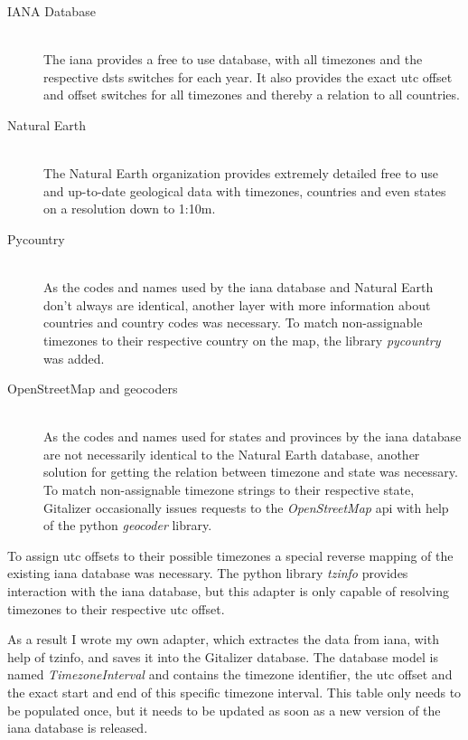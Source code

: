 \begin{description}
    \item[IANA Database] \hfill \\
    The \ac{iana} provides a free to use database, with all timezones and the respective \acp{dst} switches for each year.
    It also provides the exact \ac{utc} offset and offset switches for all timezones and thereby a relation to all countries.

    \item[Natural Earth] \hfill \\
    The Natural Earth organization provides extremely detailed free to use and up-to-date geological data with timezones, countries and even states on a resolution down to 1:10m.

    \item[Pycountry] \hfill \\
    As the codes and names used by the \ac{iana} database and Natural Earth don't always are identical, another layer with more information about countries and country codes was necessary.
    To match non-assignable timezones to their respective country on the map, the library \emph{pycountry} was added.

    \item[OpenStreetMap and geocoders] \hfill \\
    As the codes and names used for states and provinces by the \ac{iana} database are not necessarily identical to the Natural Earth database, another solution for getting the relation between timezone and state was necessary.
    To match non-assignable timezone strings to their respective state, Gitalizer occasionally issues requests to the \emph{OpenStreetMap} \ac{api} with help of the python \emph{geocoder} library.

\end{description}

To assign \ac{utc} offsets to their possible timezones a special reverse mapping of the existing \ac{iana} database was necessary.
The python library \emph{tzinfo} provides interaction with the \ac{iana} database, but this adapter is only capable of resolving timezones to their respective \ac{utc} offset.

As a result I wrote my own adapter, which extractes the data from \ac{iana}, with help of tzinfo, and saves it into the Gitalizer database.
The database model is named \emph{TimezoneInterval} and contains the timezone identifier, the \ac{utc} offset and the exact start and end of this specific timezone interval.
This table only needs to be populated once, but it needs to be updated as soon as a new version of the \ac{iana} database is released.


